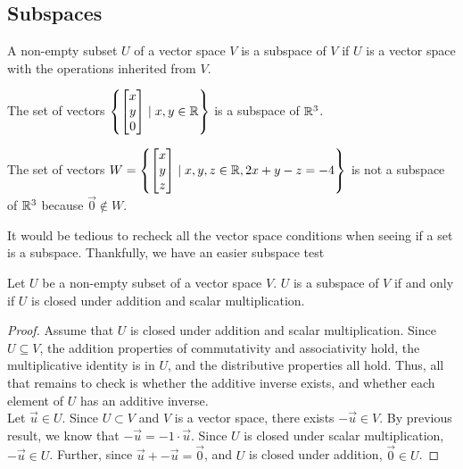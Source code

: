 \subsection{Subspaces}
\begin{definition}
	A non-empty subset $U$ of a vector space $V$ is a subspace of $V$ if $U$ is a vector space with the operations inherited from $V$.
\end{definition}

\begin{example}
	The set of vectors $\left\{\begin{bmatrix}x \\ y \\ 0\end{bmatrix} \mid x,y \in \mathbb{R}\right\}$ is a subspace of $\mathbb{R}^3$.
\end{example}

\begin{example}
	The set of vectors $W = \left\{\begin{bmatrix}x\\y\\z\end{bmatrix} \mid x,y,z \in \mathbb{R}, 2x+y-z=-4\right\}$ is not a subspace of $\mathbb{R}^3$ because $\vec{0} \not\in W$.
\end{example}

It would be tedious to recheck all the vector space conditions when seeing if a set is a subspace.
Thankfully, we have an easier subspace test
\begin{theorem}
	Let $U$ be a non-empty subset of a vector space $V$.
	$U$ is a subspace of $V$ if and only if $U$ is closed under addition and scalar multiplication.
\end{theorem}
\begin{proof}
	Assume that $U$ is closed under addition and scalar multiplication.
	Since $U \subseteq V$, the addition properties of commutativity and associativity hold, the multiplicative identity is in $U$, and the distributive properties all hold.
	Thus, all that remains to check is whether the additive inverse exists, and whether each element of $U$ has an additive inverse. \\
	
	Let $\vec{u} \in U$.
	Since $U \subset V$ and $V$ is a vector space, there exists $-\vec{u} \in V$.
	By previous result, we know that $-\vec{u} = -1\cdot\vec{u}$.
	Since $U$ is closed under scalar multiplication, $-\vec{u} \in U$.
	Further, since $\vec{u} + -\vec{u} = \vec{0}$, and $U$ is closed under addition, $\vec{0} \in U$.
\end{proof}

